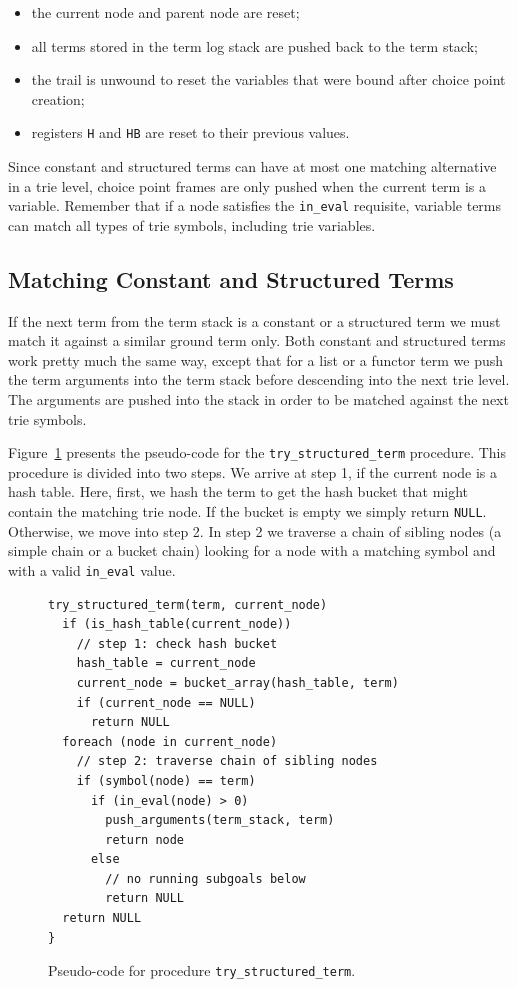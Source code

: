 \begin{itemize}
\item the current node and parent node are reset;
\item all terms stored in the term log stack are pushed back to the
  term stack;
\item the trail is unwound to reset the variables that were bound
  after choice point creation;
\item registers \texttt{H} and \texttt{HB} are reset to their previous values.
\end{itemize}

Since constant and structured terms can have at most one matching
alternative in a trie level, choice point frames are only pushed when
the current term is a variable. Remember that if a node satisfies the
\texttt{in\_eval} requisite, variable terms can match all types of trie
symbols, including trie variables.

\subsection{Matching Constant and Structured Terms}

If the next term from the term stack is a constant or a structured
term we must match it against a similar ground term only. Both
constant and structured terms work pretty much the same way, except
that for a list or a functor term we push the term arguments into the
term stack before descending into the next trie level. The arguments
are pushed into the stack in order to be matched against the next trie
symbols.

Figure~\ref{fig:try_structured_term} presents the pseudo-code for the
\texttt{try\_structured\_term} procedure. This procedure is divided into
two steps. We arrive at step 1, if the current node is a hash
table. Here, first, we hash the term to get the hash bucket that might
contain the matching trie node. If the bucket is empty we simply
return \texttt{NULL}. Otherwise, we move into step 2. In step 2 we traverse a
chain of sibling nodes (a simple chain or a bucket chain) looking for
a node with a matching symbol and with a valid \texttt{in\_eval} value.

\begin{figure}[ht]
\begin{Verbatim}
try_structured_term(term, current_node)
  if (is_hash_table(current_node))
    // step 1: check hash bucket
    hash_table = current_node
    current_node = bucket_array(hash_table, term)
    if (current_node == NULL)
      return NULL
  foreach (node in current_node)
    // step 2: traverse chain of sibling nodes
    if (symbol(node) == term)
      if (in_eval(node) > 0)
        push_arguments(term_stack, term)
        return node
      else
        // no running subgoals below
        return NULL
  return NULL
}
\end{Verbatim}
\caption{Pseudo-code for procedure \texttt{try\_structured\_term}.}
\label{fig:try_structured_term}
\end{figure}

